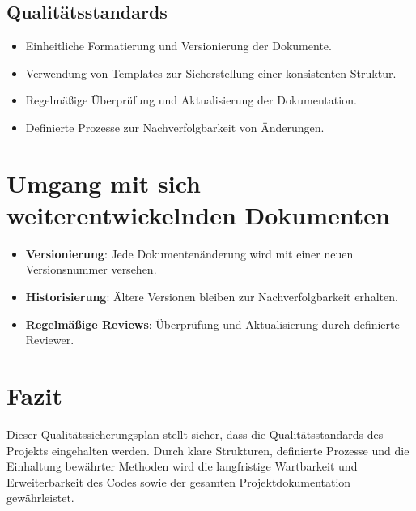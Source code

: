 \documentclass[a4paper,12pt]{article}
\begin{document}
\subsection{Qualitätsstandards}
\begin{itemize}
    \item Einheitliche Formatierung und Versionierung der Dokumente.
    \item Verwendung von Templates zur Sicherstellung einer konsistenten Struktur.
    \item Regelmäßige Überprüfung und Aktualisierung der Dokumentation.
    \item Definierte Prozesse zur Nachverfolgbarkeit von Änderungen.
\end{itemize}
\newpage

\section{Umgang mit sich weiterentwickelnden Dokumenten}
\begin{itemize}
    \item \textbf{Versionierung}: Jede Dokumentenänderung wird mit einer neuen Versionsnummer versehen.
    \item \textbf{Historisierung}: Ältere Versionen bleiben zur Nachverfolgbarkeit erhalten.
    \item \textbf{Regelmäßige Reviews}: Überprüfung und Aktualisierung durch definierte Reviewer.
\end{itemize}
\newpage

\section{Fazit}
Dieser Qualitätssicherungsplan stellt sicher, dass die Qualitätsstandards des Projekts eingehalten werden. Durch klare Strukturen, definierte Prozesse und die Einhaltung bewährter Methoden wird die langfristige Wartbarkeit und Erweiterbarkeit des Codes sowie der gesamten Projektdokumentation gewährleistet.
\newpage


\end{document}
